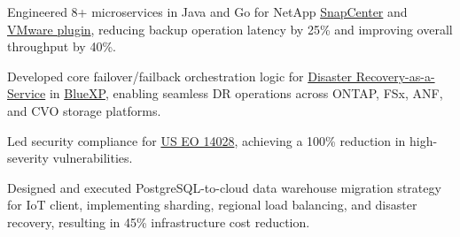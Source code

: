 \documentclass[letterpaper,11pt]{article}
\newif\ifshortresume
\newcommand{\resumeItem}[1]{
  \item\small{
    {#1 \vspace{-2pt}}
  }
}
\begin{document}
{        \resumeItem{Engineered 8+ microservices in Java and Go for NetApp \href{https://www.netapp.com/snapcenter/}{SnapCenter} and \href{https://docs.netapp.com/us-en/sc-plugin-vmware-vsphere/}{VMware plugin}, reducing backup operation latency by 25\% and improving overall throughput by 40\%.}
        \resumeItem{Developed core failover/failback orchestration logic for \href{https://www.netapp.com/data-services/disaster-recovery/}{Disaster Recovery-as-a-Service} in \href{https://bluexp.netapp.com/}{BlueXP}, enabling seamless DR operations across ONTAP, FSx, ANF, and CVO storage platforms.}
        \ifshortresume\else
        \resumeItem{Led security compliance for \href{https://www.nist.gov/itl/executive-order-14028-improving-nations-cybersecurity}{US EO 14028}, achieving a 100\% reduction in high-severity vulnerabilities.}
        \fi
        \resumeItem{Designed and executed PostgreSQL-to-cloud data warehouse migration strategy for IoT client, implementing sharding, regional load balancing, and disaster recovery, resulting in 45\% infrastructure cost reduction.}
}
\end{document}
